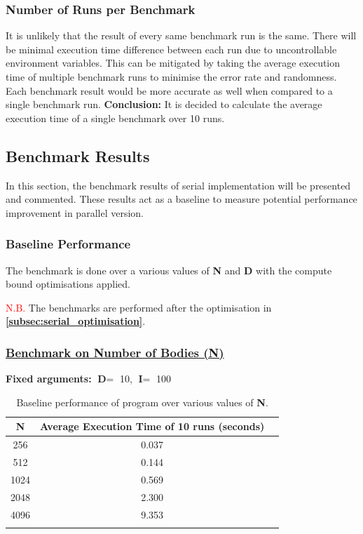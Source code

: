 \documentclass[12pt, a4paper]{article}
\let\oldcref\cref
\renewcommand{\cref}[1]{\textbf{\oldcref{#1}}}
\begin{document}
\subsubsection{Number of Runs per Benchmark}
\noindent It is unlikely that the result of every same benchmark run is the same. There will be
minimal execution time difference between each run due to uncontrollable environment variables. This
can be mitigated by taking the average execution time of multiple benchmark runs to minimise the
error rate and randomness. Each benchmark result would be more accurate as well when compared to a
single benchmark run. \textbf{Conclusion:} It is decided to calculate the average execution time of
a single benchmark over 10 runs.

\subsection{Benchmark Results} \label{subsec:serial_results}
In this section, the benchmark results of serial implementation will be presented and commented.
These results act as a baseline to measure potential performance improvement in parallel version.

\subsubsection{Baseline Performance} \label{subsec:baseline}
The benchmark is done over a various values of \textbf{N} and \textbf{D} with the compute bound
optimisations applied.

\noindent\textcolor{red}{N.B.} The benchmarks are performed after the optimisation in
\cref{subsec:serial_optimisation}.

\subsubsection*{\underline{Benchmark on Number of Bodies (N)}}
\textbf{Fixed arguments:} $\textbf{D} =$ 10, $\textbf{I} =$ 100
\renewcommand{\arraystretch}{1.3}
\begin{longtable}{|c|c|c|}
  \hline \endfirsthead \rowcolor{lightgray}
  N    & Average Execution Time of 10 runs (seconds) \\ \hline
  256  & 0.037                                       \\
  512  & 0.144                                       \\
  1024 & 0.569                                       \\
  2048 & 2.300                                       \\
  4096 & 9.353                                       \\ \hline
  \caption{Baseline performance of program over various values of \textbf{N}.}
  \label{table:baseline_n}
\end{longtable}
\renewcommand{\arraystretch}{1}
\end{document}
